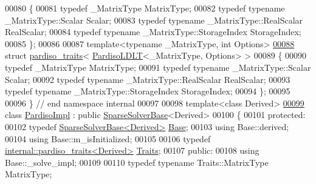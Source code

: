 \begin{DoxyCode}
00080   \{
00081     \textcolor{keyword}{typedef} \_MatrixType MatrixType;
00082     \textcolor{keyword}{typedef} \textcolor{keyword}{typename} \_MatrixType::Scalar Scalar;
00083     \textcolor{keyword}{typedef} \textcolor{keyword}{typename} \_MatrixType::RealScalar RealScalar;
00084     \textcolor{keyword}{typedef} \textcolor{keyword}{typename} \_MatrixType::StorageIndex StorageIndex;
00085   \};
00086 
00087   \textcolor{keyword}{template}<\textcolor{keyword}{typename} \_MatrixType, \textcolor{keywordtype}{int} Options>
\hyperlink{struct_eigen_1_1internal_1_1pardiso__traits_3_01_pardiso_l_d_l_t_3_01___matrix_type_00_01_options_01_4_01_4}{00088}   \textcolor{keyword}{struct }\hyperlink{struct_eigen_1_1internal_1_1pardiso__traits}{pardiso\_traits}< \hyperlink{class_eigen_1_1_pardiso_l_d_l_t}{PardisoLDLT}<\_MatrixType, Options> >
00089   \{
00090     \textcolor{keyword}{typedef} \_MatrixType MatrixType;
00091     \textcolor{keyword}{typedef} \textcolor{keyword}{typename} \_MatrixType::Scalar Scalar;
00092     \textcolor{keyword}{typedef} \textcolor{keyword}{typename} \_MatrixType::RealScalar RealScalar;
00093     \textcolor{keyword}{typedef} \textcolor{keyword}{typename} \_MatrixType::StorageIndex StorageIndex;    
00094   \};
00095 
00096 \} \textcolor{comment}{// end namespace internal}
00097 
00098 \textcolor{keyword}{template}<\textcolor{keyword}{class} Derived>
\hyperlink{class_eigen_1_1_pardiso_impl}{00099} \textcolor{keyword}{class }\hyperlink{class_eigen_1_1_pardiso_impl}{PardisoImpl} : \textcolor{keyword}{public} \hyperlink{group___sparse_core___module_class_eigen_1_1_sparse_solver_base}{SparseSolverBase}<Derived>
00100 \{
00101   \textcolor{keyword}{protected}:
00102     \textcolor{keyword}{typedef} \hyperlink{group___sparse_core___module_class_eigen_1_1_sparse_solver_base}{SparseSolverBase<Derived>} \hyperlink{group___sparse_core___module_class_eigen_1_1_sparse_solver_base}{Base};
00103     \textcolor{keyword}{using} Base::derived;
00104     \textcolor{keyword}{using} Base::m\_isInitialized;
00105     
00106     \textcolor{keyword}{typedef} \hyperlink{struct_eigen_1_1internal_1_1pardiso__traits}{internal::pardiso\_traits<Derived>} 
      \hyperlink{struct_eigen_1_1internal_1_1pardiso__traits}{Traits};
00107   \textcolor{keyword}{public}:
00108     \textcolor{keyword}{using} Base::\_solve\_impl;
00109     
00110     \textcolor{keyword}{typedef} \textcolor{keyword}{typename} Traits::MatrixType MatrixType;

\end{DoxyCode}
